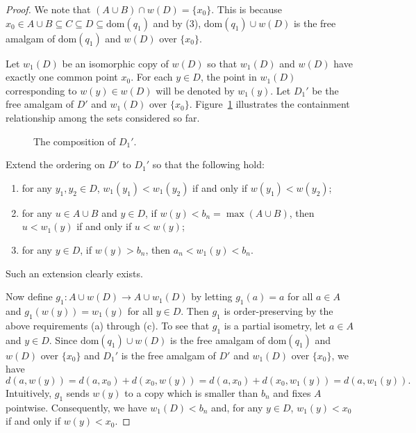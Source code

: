 \documentclass{amsart}
\theoremstyle{definition}
\theoremstyle{remark}
\begin{document}
\begin{proof}
We note that $(A \cup B) \cap w(D) = \{x_0\}$. This is because $x_0\in A\cup  B\subseteq C\subseteq D\subseteq \mbox{dom}(q_1)$ and by (3), $\mbox{dom}(q_1)\cup w(D)$ is the free amalgam of $\mbox{dom}(q_1)$ and $w(D)$ over $\{x_0\}$. 

Let $w_1(D)$ be an isomorphic copy of $w(D)$ so that $w_1(D)$ and $w(D)$ have exactly one common point $x_0$. For each $y\in D$, the point in $w_1(D)$ corresponding to $w(y)\in w(D)$ will be denoted by $w_1(y)$. Let $D_1'$ be the free amalgam of $D'$ and $w_1(D)$ over $\{x_0\}$. Figure~\ref{fig:1} illustrates the containment relationship among the sets considered so far. 

\begin{figure}[h]
\caption{The composition of $D_1'$. \label{fig:1}}
\end{figure}
      
Extend the ordering on $D'$ to $D_1'$ so that the following hold:
    \begin{enumerate}
       \item[(a)] for any $y_1,y_2 \in D$, $w_1(y_1) < w_1(y_2)$ if and only if $w(y_1) < w(y_2)$;
       \item[(b)] for any $u \in A \cup B$ and $y \in D$, if $w(y) < b_n=\max(A\cup B)$, then $u<w_1(y)$ if and only if $u<w(y)$;
       \item[(c)] for any $y \in D$, if $w(y) > b_n$, then $a_n < w_1(y) <b_n$. 
    \end{enumerate}
    Such an extension clearly exists. 

Now define $g_1\colon A\cup w(D)\to A\cup w_1(D)$ by letting $g_1(a) = a$ for all $a\in A$ and $g_1(w(y)) = w_1(y)$ for all $y\in D$. Then $g_1$ is order-preserving by the above requirements (a) through (c). To see that $g_1$ is a partial isometry, let $a \in A$ and $y\in D$. Since $\mbox{dom}(q_1)\cup w(D)$ is the free amalgam of $\mbox{dom}(q_1)$ and $w(D)$ over $\{x_0\}$ and $D_1'$ is the free amalgam of $D'$ and $w_1(D)$ over $\{x_0\}$, we have \[d(a, w(y))=d(a,x_0)+d(x_0,w(y))=d(a,x_0)+d(x_0,w_1(y))=d(a,w_1(y)).\] 
    Intuitively, $g_1$ sends $w(y)$ to a copy which is smaller than $b_n$ and fixes $A$ pointwise. Consequently, we have $w_1(D)<b_n$ and, for any $y \in D$, $w_1(y) <x_0$ if and only if $w(y)<x_0$.
    

\end{proof}
\end{document}
